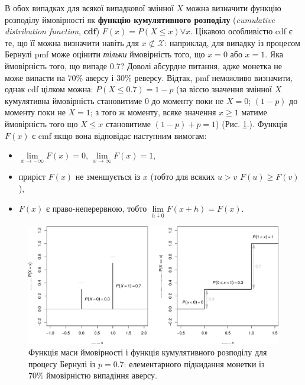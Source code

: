 \documentclass[
  11pt,
]{book}
\begin{document}
В обох випадках для всякої випадкової змінної \(X\) можна визначити функцію розподілу ймовірності як \textbf{функцію кумулятивного розподілу} (\emph{cumulative distribution function}, \textbf{cdf}) \(F(x) = P(X \leq x) \forall x\). Цікавою особливістю cdf є те, що її можна визначити навіть для \(x \not\subset \mathcal{X}\): наприклад, для випадку із процесом Бернулі pmf може оцінити \emph{тільки} ймовірність того, що \(x = 0\) або \(x = 1\). Яка ймовірність того, що випаде \(0.7\)? Доволі абсурдне питання, адже монетка не може випасти на \(70\%\) аверсу і \(30\%\) реверсу. Відтак, pmf неможливо визначити, однак cdf цілком можна: \(P (X \leq 0.7) = 1-p\) (за віссю значення змінної \(X\) кумулятивна ймовірність становитиме \(0\) до моменту поки не \(X = 0\); \((1-p)\) до моменту поки не \(X = 1\); з того ж моменту, всяке значення \(x \geq 1\) матиме ймовірність того що \(X \leq x\) становитиме \((1 - p) + p = 1\)) (Рис. \ref{fig:fig-3-9}.). Функція \(F(x)\) є cmf якщо вона відповідає наступним вимогам:

\begin{itemize}
\item
  \(\lim \limits_{x \rightarrow - \infty} F(x) = 0\), \(\lim \limits_{x \rightarrow  \infty} F(x) = 1\),
\item
  приріст \(F(x)\) не зменшується із \(x\) (тобто для всяких \(u > v\) \(F(u) \geq F(v)\)),
\item
  \(F(x)\) є право-неперервною, тобто \(\lim \limits_{h \downarrow 0} F(x + h) = F(x)\).
\end{itemize}

\begin{figure}
\centering
\includegraphics{bookdown-demo_files/figure-latex/fig-3-9-1.pdf}
\caption{\label{fig:fig-3-9}Функція маси ймовірності і функція кумулятивного розподілу для процесу Бернулі із \(p = 0.7\): елементарного підкидання монетки із \(70 \%\) ймовірністю випадіння аверсу.}
\end{figure}
\end{document}
